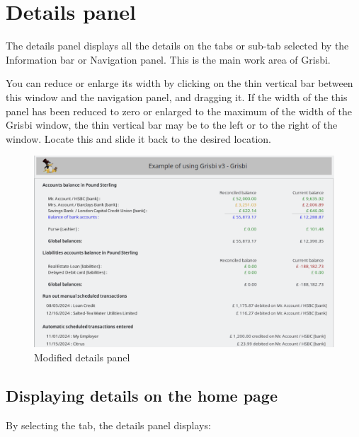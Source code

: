 \section{Details panel\label{home-details}}

The details panel displays all the details on the tabs or sub-tab selected by the Information bar or Navigation panel. This is the main work area of Grisbi.

You can reduce or enlarge its width by clicking on the thin vertical bar between this window and the navigation panel, and dragging it. If the width of the this panel has been reduced to zero or enlarged to the maximum of the width of the Grisbi window, the thin vertical bar may be to the left or to the right of the window. Locate this and slide it back to the desired location.

\begin{figure}[htbp]			%
	\begin{center}
		\includegraphics[width=1\textwidth]{image/screenshot/home_details.png}
	\end{center}
	\caption{Modified details panel}		%
	\label{home_details}
\end{figure}
 
\subsection{Displaying details on the home page\label{home-details-homepage}}

By selecting the  tab, the details panel displays:

